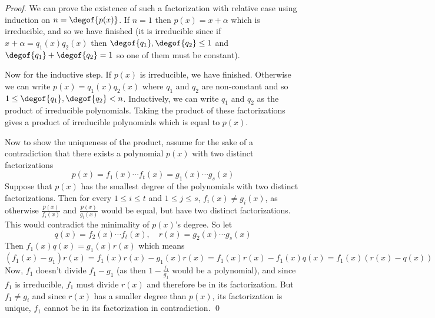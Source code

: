 \begin{proof}

    We can prove the existence of such a factorization with relative ease using induction on $n=\degof{p(x)}$.
    If $n=1$ then $p(x)=x+\alpha$ which is irreducible, and so we have finished (it is irreducible since if $x+\alpha=q_1(x)q_2(x)$ then $\degof{q_1},\degof{q_2}\leq1$ and $\degof{q_1}+\degof{q_2}=1$ so one
    of them must be constant).

    Now for the inductive step.
    If $p(x)$ is irreducible, we have finished.
    Otherwise we can write $p(x)=q_1(x)q_2(x)$ where $q_1$ and $q_2$ are non-constant and so $1\leq\degof{q_1},\degof{q_2}<n$.
    Inductively, we can write $q_1$ and $q_2$ as the product of irreducible polynomials.
    Taking the product of these factorizations gives a product of irreducible polynomials which is equal to $p(x)$.

    Now to show the uniqueness of the product, assume for the sake of a contradiction that there exists a polynomial $p(x)$ with two distinct factorizations
    \[ p(x) = f_1(x)\cdots f_t(x) = g_1(x)\cdots g_s(x) \]
    Suppose that $p(x)$ has the smallest degree of the polynomials with two distinct factorizations.
    Then for every $1\leq i\leq t$ and $1\leq j\leq s$, $f_i(x)\neq g_i(x)$, as otherwise $\frac{p(x)}{f_i(x)}$ and $\frac{p(x)}{g_i(x)}$ would be equal, but have two distinct factorizations.
    This would contradict the minimality of $p(x)$'s degree.
    So let
    \[ q(x) = f_2(x)\cdots f_t(x),\quad r(x) = g_2(x)\cdots g_s(x) \]
    Then $f_1(x)q(x)=g_1(x)r(x)$ which means
    \[ (f_1(x)-g_1)r(x) = f_1(x)r(x) - g_1(x)r(x) = f_1(x)r(x)-f_1(x)q(x) = f_1(x)(r(x)-q(x)) \]
    Now, $f_1$ doesn't divide $f_1-g_1$ (as then $1-\frac{f_1}{g_1}$ would be a polynomial), and since $f_1$ is irreducible, $f_1$ must divide $r(x)$ and therefore be in its factorization.
    But $f_1\neq g_i$ and since $r(x)$ has a smaller degree than $p(x)$, its factorization is unique, $f_1$ cannot be in its factorization in contradiction.
    \qed

\end{proof}

